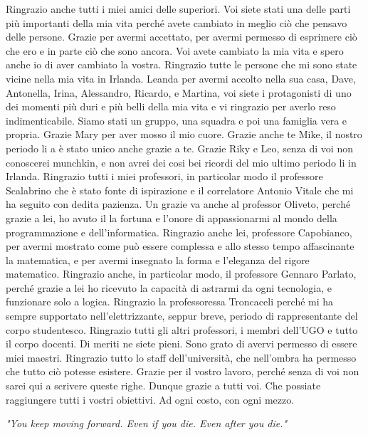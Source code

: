 \newline\newline
Ringrazio anche tutti i miei amici delle superiori. Voi siete stati una delle parti più importanti della mia vita perché avete cambiato in meglio ciò che pensavo delle persone. Grazie per avermi accettato, per avermi permesso di esprimere ciò che ero e in parte ciò che sono ancora. Voi avete cambiato la mia vita e spero anche io di aver cambiato la vostra.
\newline\newline
Ringrazio tutte le persone che mi sono state vicine nella mia vita in Irlanda. Leanda per avermi accolto nella sua casa, Dave, Antonella, Irina, Alessandro, Ricardo, e Martina, voi siete i protagonisti di uno dei momenti più duri e più belli della mia vita e vi ringrazio per averlo reso indimenticabile. Siamo stati un gruppo, una squadra e poi una famiglia vera e propria. Grazie Mary per aver mosso il mio cuore. Grazie anche te Mike, il nostro periodo li a è stato unico anche grazie a te. Grazie Riky e Leo, senza di voi non conoscerei munchkin, e non avrei dei cosi bei ricordi del mio ultimo periodo li in Irlanda.
\newline\newline
Ringrazio tutti i miei professori, in particolar modo il professore Scalabrino che è stato fonte di ispirazione e il correlatore Antonio Vitale che mi ha seguito con dedita pazienza. Un grazie va anche al professor Oliveto, perché grazie a lei, ho avuto il la fortuna e l'onore di appassionarmi al mondo della programmazione e dell'informatica. Ringrazio anche lei, professore Capobianco, per avermi mostrato come può essere complessa e allo stesso tempo affascinante la matematica, e per avermi insegnato la forma e l'eleganza del rigore matematico. Ringrazio anche, in particolar modo, il professore Gennaro Parlato, perché grazie a lei ho ricevuto la capacità di astrarmi da ogni tecnologia, e funzionare solo a logica. Ringrazio la professoressa Troncaceli perché mi ha sempre supportato nell'elettrizzante, seppur breve, periodo di rappresentante del corpo studentesco. Ringrazio tutti gli altri professori, i membri dell'UGO e tutto il corpo docenti. Di meriti ne siete pieni. Sono grato di avervi permesso di essere miei maestri.
Ringrazio tutto lo staff dell'università, che nell'ombra ha permesso che tutto ciò potesse esistere. Grazie per il vostro lavoro, perché senza di voi non sarei qui a scrivere queste righe.
\newline\newline
Dunque grazie a tutti voi.\newline
Che possiate raggiungere tutti i vostri obiettivi.\newline
Ad ogni costo, con ogni mezzo.
\newline

\begin{center}
	\textit{"You keep moving forward. Even if you die. Even after you die."}
\end{center}

